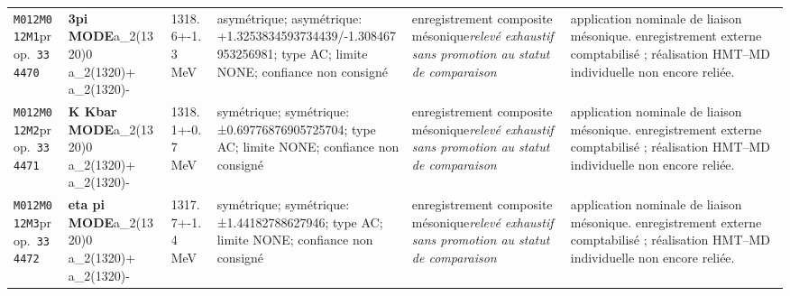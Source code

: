 \begin{landscape}
\begin{longtable}{L{1.85cm}L{4.45cm}L{2.35cm}L{4.05cm}L{3.35cm}L{7.15cm}}
\texttt{M012}\newline \texttt{M012M1}\newline prop.\ \texttt{334470} & \textbf{3pi MODE}\newline a\_\allowbreak{}2(1320)0 \textbar{}\allowbreak{} a\_\allowbreak{}2(1320)+ \textbar{}\allowbreak{} a\_\allowbreak{}2(1320)- & 1318.6+-1.3\,MeV & asymétrique; asymétrique: +1.3253834593734439/-1.308467953256981; type AC; limite NONE; confiance non consigné & enregistrement composite mésonique\newline \emph{relevé exhaustif sans promotion au statut de comparaison} & application nominale de liaison mésonique. enregistrement externe comptabilisé ; réalisation HMT--MD individuelle non encore reliée. \\
\texttt{M012}\newline \texttt{M012M2}\newline prop.\ \texttt{334471} & \textbf{K Kbar MODE}\newline a\_\allowbreak{}2(1320)0 \textbar{}\allowbreak{} a\_\allowbreak{}2(1320)+ \textbar{}\allowbreak{} a\_\allowbreak{}2(1320)- & 1318.1+-0.7\,MeV & symétrique; symétrique: ±0.69776876905725704; type AC; limite NONE; confiance non consigné & enregistrement composite mésonique\newline \emph{relevé exhaustif sans promotion au statut de comparaison} & application nominale de liaison mésonique. enregistrement externe comptabilisé ; réalisation HMT--MD individuelle non encore reliée. \\
\texttt{M012}\newline \texttt{M012M3}\newline prop.\ \texttt{334472} & \textbf{eta pi MODE}\newline a\_\allowbreak{}2(1320)0 \textbar{}\allowbreak{} a\_\allowbreak{}2(1320)+ \textbar{}\allowbreak{} a\_\allowbreak{}2(1320)- & 1317.7+-1.4\,MeV & symétrique; symétrique: ±1.44182788627946; type AC; limite NONE; confiance non consigné & enregistrement composite mésonique\newline \emph{relevé exhaustif sans promotion au statut de comparaison} & application nominale de liaison mésonique. enregistrement externe comptabilisé ; réalisation HMT--MD individuelle non encore reliée. \\

\end{longtable}
\end{landscape}

